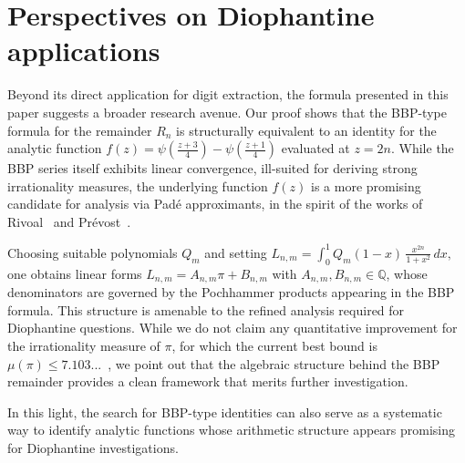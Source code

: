 \documentclass[11pt]{article}
\numberwithin{equation}{section}
\theoremstyle{plain}
\begin{document}
\section{Perspectives on Diophantine applications}

Beyond its direct application for digit extraction, the formula presented in this paper suggests a broader research avenue. Our proof shows that the BBP-type formula for the remainder $R_n$ is structurally equivalent to an identity for the analytic function $f(z) = \psi\left(\frac{z+3}{4}\right) - \psi\left(\frac{z+1}{4}\right)$ evaluated at $z=2n$. While the BBP series itself exhibits linear convergence, ill-suited for deriving strong irrationality measures, the underlying function $f(z)$ is a more promising candidate for analysis via Padé approximants, in the spirit of the works of Rivoal~\cite{Rivoal2001} and Prévost~\cite{Prevost1995,Prevost2000}.

Choosing suitable polynomials $Q_m$ and setting $L_{n,m}=\int_0^1 Q_m(1-x)\,\frac{x^{2n}}{1+x^2}\,dx,$ one obtains linear forms $L_{n,m}=A_{n,m}\pi+B_{n,m}$ with $A_{n,m},B_{n,m}\in\mathbb{Q}$, whose denominators are governed by the Pochhammer products appearing in the BBP formula. This structure is amenable to the refined analysis required for Diophantine questions. While we do not claim any quantitative improvement for the irrationality measure of $\pi$, for which the current best bound is $\mu(\pi) \le 7.103...$~\cite{ZeilbergerZudilin2019}, we point out that the algebraic structure behind the BBP remainder provides a clean framework that merits further investigation.

In this light, the search for BBP-type identities can also serve as a systematic way to identify analytic functions whose arithmetic structure appears promising for Diophantine investigations.
\end{document}
